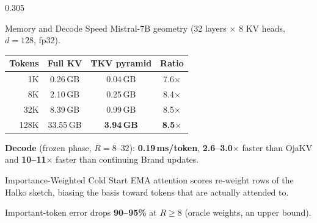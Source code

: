 \documentclass[final]{beamer}
\begin{document}
\begin{frame}[t]
\begin{columns}[t]
\begin{column}{0.305\paperwidth}
\begin{block}{Memory and Decode Speed}
Mistral-7B geometry (32 layers $\times$ 8 KV heads, $d{=}128$, fp32).
\vspace{0.3cm}
\begin{center}
\begin{tabular}{rccc}
\toprule
Tokens & Full KV & TKV pyramid & Ratio \\
\midrule
  1K &  0.26\,GB & 0.04\,GB & 7.6$\times$ \\
  8K &  2.10\,GB & 0.25\,GB & 8.4$\times$ \\
 32K &  8.39\,GB & 0.99\,GB & 8.5$\times$ \\
128K & 33.55\,GB & \textbf{3.94\,GB} & \textbf{\color{accent}8.5$\times$} \\
\bottomrule
\end{tabular}
\end{center}
\vspace{0.3cm}
\textbf{Decode} (frozen phase, $R{=}8$--$32$): \textbf{0.19\,ms/token},
\textbf{2.6--3.0$\times$} faster than OjaKV and \textbf{10--11$\times$}
faster than continuing Brand updates.
\end{block}

\begin{block}{Importance-Weighted Cold Start}
EMA attention scores re-weight rows of the Halko sketch, biasing the basis
toward tokens that are actually attended to.
\vspace{0.3cm}
\begin{center}
\end{center}
Important-token error drops \textbf{90--95\%} at $R \ge 8$
(oracle weights, an upper bound).
\end{block}


\end{column}
\end{columns}

\end{frame}
\end{document}
